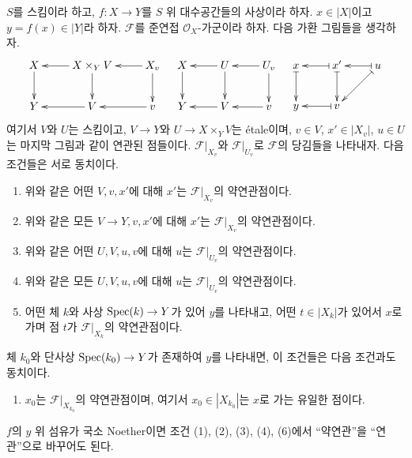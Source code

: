 \begin{lemma}
\label{lemma-relative-assassin}
$S$를 스킴이라 하고, $f : X \to Y$를 $S$ 위 대수공간들의 사상이라 하자.
$x \in |X|$이고 $y = f(x) \in |Y|$라 하자. $\mathcal{F}$를 준연접
$\mathcal{O}_X$-가군이라 하자. 다음 가환 그림들을 생각하자.
$$
\xymatrix{
X \ar[d] & X \times_Y V \ar[d] \ar[l] & X_v \ar[d] \ar[l] \\
Y & V \ar[l] & v \ar[l]
}
\quad
\xymatrix{
X \ar[d] & U \ar[d] \ar[l] & U_v \ar[d] \ar[l] \\
Y & V \ar[l] & v \ar[l]
}
\quad
\xymatrix{
x \ar@{|->}[d] &
x' \ar@{|->}[d] \ar@{|->}[l] &
u \ar@{|->}[ld] \ar@{|->}[l] \\
y &
v \ar@{|->}[l]
}
$$
여기서 $V$와 $U$는 스킴이고, $V \to Y$와
$U \to X \times_Y V$는 \'etale이며, $v \in V$, $x' \in |X_v|$,
$u \in U$는 마지막 그림과 같이 연관된 점들이다.
$\mathcal{F}|_{X_v}$와 $\mathcal{F}|_{U_v}$로 $\mathcal{F}$의 당김들을
나타내자.
다음 조건들은 서로 동치이다.
\begin{enumerate}
\item 위와 같은 어떤 $V, v, x'$에 대해 $x'$는
$\mathcal{F}|_{X_v}$의 약연관점이다.
\item 위와 같은 모든 $V \to Y, v, x'$에 대해 $x'$는
$\mathcal{F}|_{X_v}$의 약연관점이다.
\item 위와 같은 어떤 $U, V, u, v$에 대해 $u$는
$\mathcal{F}|_{U_v}$의 약연관점이다.
\item 위와 같은 모든 $U, V, u, v$에 대해 $u$는
$\mathcal{F}|_{U_v}$의 약연관점이다.
\item 어떤 체 $k$와 사상 $\mathop{\mathrm{Spec}}(k) \to Y$가 있어 $y$를 나타내고,
어떤 $t \in |X_k|$가 있어서 $x$로 가며 점 $t$가
$\mathcal{F}|_{X_k}$의 약연관점이다.
\end{enumerate}
체 $k_0$와 단사상 $\mathop{\mathrm{Spec}}(k_0) \to Y$가 존재하여 $y$를 나타내면,
이 조건들은 다음 조건과도 동치이다.
\begin{enumerate}
\item[(6)] $x_0$는 $\mathcal{F}|_{X_{k_0}}$의 약연관점이며,
여기서 $x_0 \in |X_{k_0}|$는 $x$로 가는 유일한 점이다.
\end{enumerate}
$f$의 $y$ 위 섬유가 국소 Noether이면 조건 (1), (2), (3), (4), (6)에서
``약연관''을 ``연관''으로 바꾸어도 된다.
\end{lemma}

